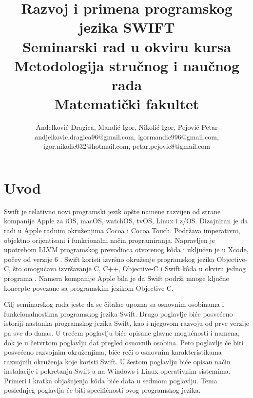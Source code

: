 \documentclass[a4paper]{article}
\begin{document}
\title{Razvoj i primena programskog jezika SWIFT \\ \small{Seminarski rad u okviru kursa\\Metodologija stručnog i naučnog rada\\ Matematički fakultet}}

\author{Anđelković Dragica, Mandić Igor, Nikolić Igor, Pejović  Petar\\ andjelkovic.dragica96@gmail.com,  igormandic996@gmail.com, \\ igor.nikolic032@hotmail.com, petar.pejovic8@gmail.com}


\maketitle



\tableofcontents

\newpage

\section{Uvod}
\label{sec:prviDeo}
Swift je relativno novi programski jezik opšte namene razvijen od strane kompanije Apple za iOS, macOS, watchOS, tvOS, Linux i z/OS. Dizajniran je da radi u Apple radnim okruženjima Cocoa i Cocoa Touch. Podržava imperativni, objektno orijentisani i funkcionalni način programiranja. Napravljen je upotrebom LLVM programskog prevodioca otvorenog k\^{o}da i uključen je u Xcode, počev od verzije 6 \cite{swift_sajt}. Swift koristi izvršno okruženje programskog jezika Objective-C, što omogućava izvršavanje C, C++, Objective-C i Swift k\^{o}da u okviru jednog programa \cite{arc_sajt}. Namera kompanije Apple bila je da Swift podrži mnoge ključne koncepte povezane sa programskim jezikom Objective-C.

Cilj seminarskog rada jeste da se čitalac upozna sa osnovnim osobinama i funkcionalnostima programskog jezika Swift. Drugo poglavlje biće posvećeno istoriji nastanka programskog jezika Swift, kao i njegovom razvoju od prve verzije pa sve do danas. U trećem poglavlju biće opisane glavne mogućnosti i namena, dok je u četvrtom poglavlju dat pregled osnovnih osobina. Peto poglavlje će biti posvećeno razvojnim okruženjima, biće reči o osnovnim karakteristikama  razvojnih okruženja koje koristi Swift. U šestom poglavlju biće opisan način instalacije i pokretanja Swift-a na Windows i Linux operativnim sistemima. Primeri i kratka objašnjenja k\^{o}da biće data u sedmom poglavlju. Tema poslednjeg poglavlja će biti specifičnosti ovog programskog jezika.
\end{document}
